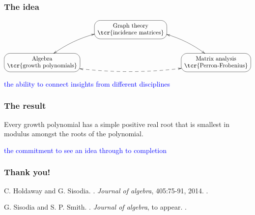 \documentclass{beamer}
\begin{document}
\begin{frame}
\frametitle{The idea}
$$
\xymatrix{
&*+<10pt>[F-:<10pt>]\txt{Graph theory \\ \tcr{incidence matrices}} \ar@/^15pt/@{<->}[rd] & \\
*+<10pt>[F-:<10pt>]\txt{Algebra \\ \tcr{growth polynomials}} \ar@/_15pt/@{<-->}[rr] \ar@/^15pt/@{<->}[ur] & & *+<10pt>[F-:<10pt>]\txt{Matrix analysis \\ \tcr{Perron-Frobenius}}
}
$$

\pause

\hfil
\hfil

\textcolor{blue}{the ability to connect insights from different disciplines}

\end{frame}

\begin{frame}
\frametitle{The result}

\begin{thm}[Sisodia]
Every growth polynomial has a simple positive real root that is smallest in modulus amongst the roots of the polynomial.
\end{thm}

\pause

\hfil

\textcolor{blue}{the commitment to see an idea through to completion}


\end{frame}


\begin{frame}
\frametitle{Thank you!}

\hfil

C. Holdaway and G. Sisodia. . {\it Journal of algebra}, 405:75-91, 2014. .

\hfil

G. Sisodia and S. P. Smith. . {\it Journal of algebra}, to appear. .


\end{frame}
\end{document}
